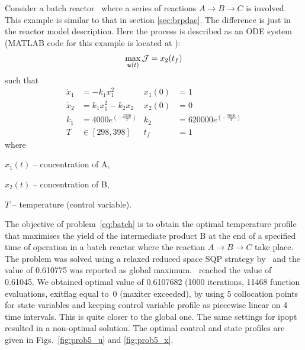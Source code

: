 Consider a batch reactor~\citep{raj01,dad95} where a series of
reactions $A \rightarrow B\rightarrow C$ is involved. This example is
similar to that in section \ref{sec:brpdae}. The difference is just in
the reactor model description. Here the process is described as an ODE
system (MATLAB code for this example is located at
):
\begin{equation}
\max_{\ve{u}(t)} \mf{J} = x_{2}(t_{f}) \label{eq:batch}
\end{equation}
such that
\begin{align*}
\dot{x}_1&=-k_{1}x_{1}^{2} &x_1(0) &= 1 \\
\dot{x}_2&=k_{1}x_{1}^{2}-k_{2}x_{2} &x_2(0) &= 0 \\
k_1 &=4000e^{(-\frac{2500}{T})} &k_2 &=620000e^{(-\frac{5000}{T})} \\
T &\in [298,398] & t_f &=1
\end{align*}
where
\begin{description}
\item $x_{1}(t)$ -- concentration of A,
\item $x_{2}(t)$ -- concentration of B,
\item $T$ -- temperature (control variable).
\end{description}

The objective of problem~\eqref{eq:batch} is to obtain the optimal
temperature profile that maximises the yield of the intermediate
product B at the end of a specified time of operation in a batch
reactor where the reaction $A \rightarrow B \rightarrow C$ take
place. The problem was solved using a relaxed reduced space SQP
strategy by~\cite{log89} and the value of 0.610775 was reported as
global maximum.~\citeauthor{raj01} reached the value of 0.61045. We
obtained optimal value of 0.6107682 (1000 iterations, 11468 function
evaluations, exitflag equal to~0 (maxiter exceeded), by using
5 collocation points for state variables and keeping control variable
profile as piecewise linear on 4 time intervals. This is quite closer
to the global one. The same settings for ipopt resulted in
a non-optimal solution. The optimal control
and state profiles are given in Figs.~\ref{fig:prob5_u} and
\ref{fig:prob5_x}.
  
